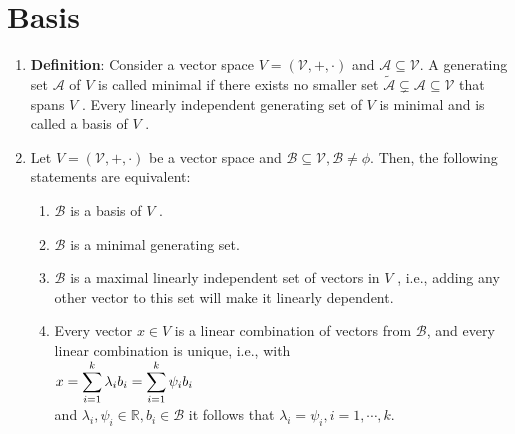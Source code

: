 \section{Basis}

\begin{enumerate}
    \item \textbf{Definition}: Consider a vector space $V = (\mathcal{V}, +, \cdot)$ and $\mathcal{A} \subseteq  \mathcal{V}$. 
    A generating set $\mathcal{A}$ of $V$ is called minimal if there exists no smaller set $\tilde{\mathcal{A}} \subsetneq \mathcal{A} \subseteq \mathcal{V}$ that spans $V$ . 
    Every linearly independent generating set of $V$ is minimal and is called a basis of $V$ .
    \hfill \cite{mfml/book/mml/Deisenroth-Faisal-Ong}

    \item Let $V = (\mathcal{V}, +, \cdot)$ be a vector space and $\mathcal{B} \subseteq \mathcal{V}, \mathcal{B} \neq \phi$. Then, the following statements are equivalent:
    \hfill \cite{mfml/book/mml/Deisenroth-Faisal-Ong}
    \begin{enumerate}
        \item $\mathcal{B}$ is a basis of $V$ .
        \hfill \cite{mfml/book/mml/Deisenroth-Faisal-Ong}

        \item $\mathcal{B}$ is a minimal generating set.
        \hfill \cite{mfml/book/mml/Deisenroth-Faisal-Ong}

        \item $\mathcal{B}$ is a maximal linearly independent set of vectors in $V$ , i.e., adding any other vector to this set will make it linearly dependent.
        \hfill \cite{mfml/book/mml/Deisenroth-Faisal-Ong}

        \item Every vector $x \in V$ is a linear combination of vectors from $\mathcal{B}$, and every linear combination is unique, i.e., with
        \\
        $
            x 
            = \displaystyle\sum_{i=1}^k \lambda_i b_i
            = \displaystyle\sum_{i=1}^k \psi_i b_i
        $
        \\
        and $\lambda_i , \psi_i \in \mathbb{R}, b_i \in \mathcal{B}$ it follows that $\lambda_i = \psi_i , i = 1, \cdots , k$.
        \hfill \cite{mfml/book/mml/Deisenroth-Faisal-Ong}
    \end{enumerate}
\end{enumerate}





























